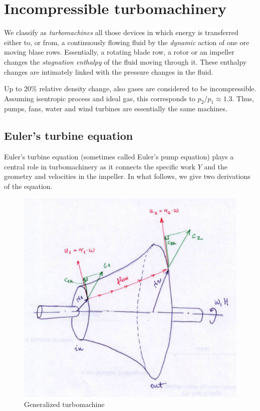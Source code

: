 \chapter{Incompressible turbomachinery}

We classify as \emph{turbomachines} all those devices in which energy is transferred either to, or from, a continuously flowing fluid by the \emph{dynamic} action of one ore moving blase rows. Essentially, a rotating blade row, a rotor or an impeller changes the \emph{stagnation enthalpy} of the fluid moving through it. These enthalpy changes are intimately linked with the pressure changes in the fluid.

Up to 20\% relative density change, also gases are considered to be incompressible. Assuming isentropic process and ideal gas, this corresponds to $p_2/p_1 \approx 1.3$. Thus, pumps, fans, water and wind turbines are essentially the same machines.

\section{Euler's turbine equation}

Euler's turbine equation (sometimes called Euler's pump equation) plays a central role in turbomachinery as it connects the specific work $Y$ and the geometry and velocities in the impeller. In what follows, we give two derivations of the equation.

\begin{figure}[ht]
\begin{center}
\includegraphics[scale=0.5]{figs/euler_turbine_equation_fig.png}
\caption{\label{gen_turbom}Generalized turbomachine}
\end{center}
\end{figure}

